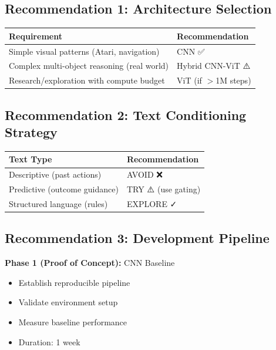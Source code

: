 \documentclass[12pt,a4paper,openany]{report}
\begin{document}
\subsection{Recommendation 1: Architecture Selection}

\begin{table}[H]
\centering
\small
\begin{tabular}{ll}
\toprule
Requirement & Recommendation \\
\midrule
Simple visual patterns (Atari, navigation) & CNN ✅ \\
Complex multi-object reasoning (real world) & Hybrid CNN-ViT ⚠️ \\
Research/exploration with compute budget & ViT (if $>$1M steps) \\
\bottomrule
\end{tabular}
\end{table}

\subsection{Recommendation 2: Text Conditioning Strategy}

\begin{table}[H]
\centering
\small
\begin{tabular}{ll}
\toprule
Text Type & Recommendation \\
\midrule
Descriptive (past actions) & AVOID ❌ \\
Predictive (outcome guidance) & TRY ⚠️ (use gating) \\
Structured language (rules) & EXPLORE ✓ \\
\bottomrule
\end{tabular}
\end{table}

\subsection{Recommendation 3: Development Pipeline}

\textbf{Phase 1 (Proof of Concept):} CNN Baseline
\begin{itemize}
    \item Establish reproducible pipeline
    \item Validate environment setup
    \item Measure baseline performance
    \item Duration: 1 week
\end{itemize}
\end{document}
